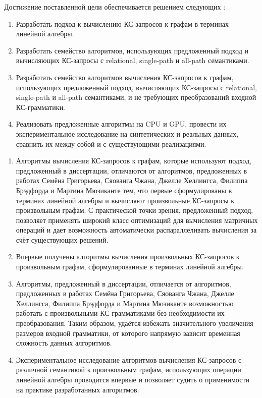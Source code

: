 Достижение поставленной цели обеспечивается решением следующих {\tasks}:
\begin{enumerate}[beginpenalty=10000] %
  \item Разработать подход к вычислению КС-запросов к графам в терминах линейной алгебры.
  \item Разработать семейство алгоритмов, использующих предложенный подход и вычисляющих КС-запросы с relational, single-path и all-path семантиками.
  \item Разработать семейство алгоритмов вычисления КС-запросов к графам, использующих предложенный подход, вычисляющих КС-запросы с relational, single-path и all-path семантиками, и не требующих преобразований входной КС-грамматики.
  \item Реализовать предложенные алгоритмы на CPU и GPU, провести их экспериментальное исследование на синтетических и реальных данных, сравнить их между собой и с существующими реализациями.
\end{enumerate}


{\novelty}
\begin{enumerate}[beginpenalty=10000] %
	
	\item Алгоритмы вычисления КС-запросов к графам, которые используют подход, предложенный в диссертации, отличаются от алгоритмов, предложенных в работах Семёна Григорьева, Сяованга Чжана, Джелле Хеллингса, Филиппа Брэдфорда и Мартина Мюзиканте тем, что первые сформулированы в терминах линейной алгебры и вычисляют произвольные КС-запросы к произвольным графам. С практической точки зрения, предложенный подход, позволяет применять широкий класс оптимизаций для вычисления матричных операций и дает возможность автоматически распараллеливать вычисления за счёт существующих решений.
	
	\item Впервые получены алгоритмы вычисления произвольных КС-запросов к произвольным графам, сформулированные в терминах линейной алгебры.
	
	\item Алгоритмы, предложенный в диссертации, отличается от алгоритмов, предложенных в работах Семёна Григорьева, Сяованга Чжана, Джелле Хеллингса, Филиппа Брэдфорда и Мартина Мюзиканте возможностью работать с произвольными КС-грамматиками без необходимости их преобразования. Таким образом, удаётся избежать значительного увеличения размеров входной грамматики, от которого напрямую зависит временная сложность данных алгоритмов.
	
	\item Экспериментальное исследование алгоритмов вычисления КС-запросов с различной семантикой к произвольным графам, использующих операции линейной алгебры проводится впервые и позволяет судить о применимости на практике разработанных алгоритмов.
	
\end{enumerate}

